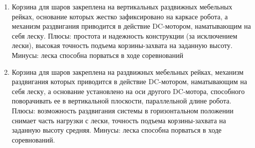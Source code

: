 \begin{enumerate}
\begin{enumerate}
\begin{enumerate}
\begin{enumerate}
	      \item Корзина для шаров закреплена на вертикальных раздвижных мебельных рейках, основание которых жестко зафиксировано на каркасе робота, а механизм раздвигания приводится в действие DC-мотором, наматывающим на себя леску. Плюсы: простота и надежность конструкции (за исключением лески), высокая точность подъема корзины-захвата на заданную высоту. Минусы: леска способна порваться в ходе соревнований
	      
	      \item Корзина для шаров закреплена на раздвижных мебельных рейках, механизм раздвигания которых приводится в действие DC-мотором, наматывающим на себя леску, а основание установлено на оси другого DC-мотора, способного поворачивать ее в вертикальной плоскости, параллельной длине робота. Плюсы: возможность раздвигания системы в горизонтальном положении снимает часть нагрузки с лески, точность подъема корзины-захвата на заданную высоту средняя. Минусы: леска способна порваться в ходе соревнований.
	      

\end{enumerate}
\end{enumerate}
\end{enumerate}
\end{enumerate}
